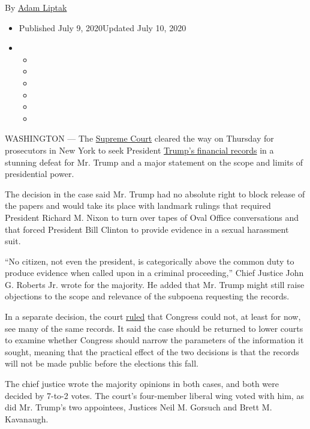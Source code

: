 By \href{https://www.nytimes.com/by/adam-liptak}{Adam Liptak}

\begin{itemize}
\item
  Published July 9, 2020Updated July 10, 2020
\item
  \begin{itemize}
  \item
  \item
  \item
  \item
  \item
  \item
  \end{itemize}
\end{itemize}

WASHINGTON --- The
\href{https://www.nytimes.com/2020/07/10/podcasts/the-daily/supreme-court-trump-taxes.html?action=click\&module=Briefings\&pgtype=Homepage}{Supreme
Court} cleared the way on Thursday for prosecutors in New York to seek
President
\href{https://www.nytimes.com/2020/07/10/nyregion/donald-trump-taxes-cy-vance.html}{Trump's
financial records} in a stunning defeat for Mr. Trump and a major
statement on the scope and limits of presidential power.

The decision in the case said Mr. Trump had no absolute right to block
release of the papers and would take its place with landmark rulings
that required President Richard M. Nixon to turn over tapes of Oval
Office conversations and that forced President Bill Clinton to provide
evidence in a sexual harassment suit.

``No citizen, not even the president, is categorically above the common
duty to produce evidence when called upon in a criminal proceeding,''
Chief Justice John G. Roberts Jr. wrote for the majority. He added that
Mr. Trump might still raise objections to the scope and relevance of the
subpoena requesting the records.

In a separate decision, the court
\href{https://www.supremecourt.gov/opinions/19pdf/19-715_febh.pdf}{ruled}
that Congress could not, at least for now, see many of the same records.
It said the case should be returned to lower courts to examine whether
Congress should narrow the parameters of the information it sought,
meaning that the practical effect of the two decisions is that the
records will not be made public before the elections this fall.

The chief justice wrote the majority opinions in both cases, and both
were decided by 7-to-2 votes. The court's four-member liberal wing voted
with him, as did Mr. Trump's two appointees, Justices Neil M. Gorsuch
and Brett M. Kavanaugh.

